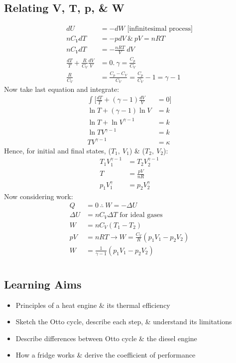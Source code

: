 \documentclass[a4paper, 11pt, normalem]{report}
\begin{document}
\section{Relating V, T, p, \& W}
\begin{align}
    dU &= -dW \text{ [infinitesimal process]} \\
    nC_{V}dT &= -pdV ~\&~ pV = nRT \\
    nC_{V}dT &= -\frac{nRT}{V}\:dV \\
    \frac{dT}{T} + \frac{R}{C_{V}}\frac{dV}{V} &= 0. ~ \gamma = \frac{C_{p}}{C_{V}} \\
    \frac{R}{C_{V}} &= \frac{C_{p} - C_{V}}{C_{V}} = \frac{C_{p}}{C_{V}} - 1 = \gamma - 1
\end{align}
Now take last equation and integrate:
\begin{align}
    \int \bigg[\frac{dT}{T} + (\gamma - 1)\frac{dV}{V} &= 0\bigg] \\
    \ln{T} + (\gamma - 1)\ln{V} &= k \\
    \ln{T} + \ln{V^{\gamma - 1}} &= k \\
    \ln{TV^{\gamma - 1}} &= k \\
    TV^{\gamma - 1} &= \kappa
\end{align}
Hence, for initial and final states, ($T_{1},\:V_{1}$) \& ($T_{2},\:V_{2}$):
\begin{align}
    T_{1}V_{1}^{\gamma - 1} &= T_{2}V_{2}^{\gamma - 1}\\
    T &= \frac{pV}{nR} \\
    p_{1}V_{1}^{\gamma} &= p_{2}V_{2}^{\gamma}
\end{align}
Now considering work:
\begin{align}
    Q &= 0 ~\therefore~ W = -{\Delta}U \\
    {\Delta}U &= nC_{V}{\Delta}T \text{ for ideal gases} \\
    W &= nC_{V}(T_{1} - T_{2}) \\
    pV &= nRT \rightarrow W = \frac{C_{V}}{R}(p_{1}V_{1} - p_{2}V_{2}) \\
    W &= \frac{1}{\gamma - 1}(p_{1}V_{1} - p_{2}V_{2})
\end{align}

\chapter{}
\section{Learning Aims}
\begin{itemize}
	\item Principles of a heat engine \& its thermal efficiency
	\item Sketch the Otto cycle, describe each step, \& understand its limitations
	\item Describe differences between Otto cycle \& the diesel engine
	\item How a fridge works \& derive the coefficient of performance
\end{itemize}
\end{document}
